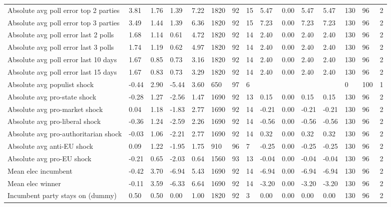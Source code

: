 \begin{longtable}{lllllllllllllll}
Absolute avg poll error top 2 parties & 3.81 & 1.76 & 1.39 & 7.22 & 1820 & 92 & 15 & 5.47 & 0.00 & 5.47 & 5.47 & 130 & 96 & 2\\
Absolute avg poll error top 3 parties & 3.49 & 1.44 & 1.39 & 6.36 & 1820 & 92 & 15 & 7.23 & 0.00 & 7.23 & 7.23 & 130 & 96 & 2\\
\addlinespace
Absolute avg poll error last 2 polls & 1.68 & 1.14 & 0.61 & 4.72 & 1820 & 92 & 14 & 2.40 & 0.00 & 2.40 & 2.40 & 130 & 96 & 2\\
Absolute avg poll error last 3 polls & 1.74 & 1.19 & 0.62 & 4.97 & 1820 & 92 & 14 & 2.40 & 0.00 & 2.40 & 2.40 & 130 & 96 & 2\\
Absolute avg poll error last 10 days & 1.67 & 0.85 & 0.73 & 3.16 & 1820 & 92 & 14 & 2.40 & 0.00 & 2.40 & 2.40 & 130 & 96 & 2\\
Absolute avg poll error last 15 days & 1.67 & 0.83 & 0.73 & 3.29 & 1820 & 92 & 14 & 2.40 & 0.00 & 2.40 & 2.40 & 130 & 96 & 2\\
Absolute avg populist shock & -0.44 & 2.90 & -5.44 & 3.60 & 650 & 97 & 6 &  &  &  &  & 0 & 100 & 1\\
\addlinespace
Absolute avg pro-state shock & -0.28 & 1.27 & -2.56 & 1.47 & 1690 & 92 & 13 & 0.15 & 0.00 & 0.15 & 0.15 & 130 & 96 & 2\\
Absolute avg pro-market shock & 0.04 & 1.18 & -1.83 & 2.77 & 1690 & 92 & 14 & -0.21 & 0.00 & -0.21 & -0.21 & 130 & 96 & 2\\
Absolute avg pro-liberal shock & -0.36 & 1.24 & -2.59 & 2.26 & 1690 & 92 & 14 & -0.56 & 0.00 & -0.56 & -0.56 & 130 & 96 & 2\\
Absolute avg pro-authoritarian shock & -0.03 & 1.06 & -2.21 & 2.77 & 1690 & 92 & 14 & 0.32 & 0.00 & 0.32 & 0.32 & 130 & 96 & 2\\
Absolute avg anti-EU shock & 0.09 & 1.22 & -1.95 & 1.75 & 910 & 96 & 7 & -0.25 & 0.00 & -0.25 & -0.25 & 130 & 96 & 2\\
\addlinespace
Absolute avg pro-EU shock & -0.21 & 0.65 & -2.03 & 0.64 & 1560 & 93 & 13 & -0.04 & 0.00 & -0.04 & -0.04 & 130 & 96 & 2\\
Mean elec incumbent & -0.42 & 3.70 & -6.94 & 5.43 & 1690 & 92 & 14 & -6.94 & 0.00 & -6.94 & -6.94 & 130 & 96 & 2\\
Mean elec winner & -0.11 & 3.59 & -6.33 & 6.64 & 1690 & 92 & 14 & -3.20 & 0.00 & -3.20 & -3.20 & 130 & 96 & 2\\
Incumbent party stays on (dummy) & 0.50 & 0.50 & 0.00 & 1.00 & 1820 & 92 & 3 & 0.00 & 0.00 & 0.00 & 0.00 & 130 & 96 & 2\\

\end{longtable}
